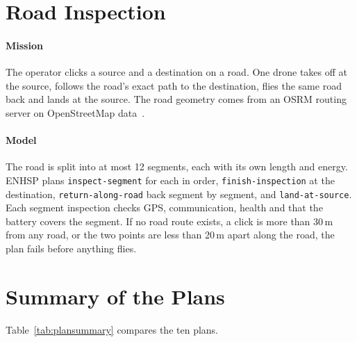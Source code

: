 \documentclass[11pt,a4paper,oneside]{report}
\newcommand{\code}[1]{\texttt{#1}}
\begin{document}
\section{Road Inspection}
\paragraph{Mission}
The operator clicks a source and a destination on a road. One drone takes off at the source,
follows the road's exact path to the destination, flies the same road back and lands at the
source. The road geometry comes from an OSRM routing server on OpenStreetMap
data~\cite{luxen2011osrm}.

\paragraph{Model}
The road is split into at most 12 segments, each with its own length and energy. ENHSP plans
\code{inspect-segment} for each in order, \code{finish-inspection} at the destination,
\code{return-along-road} back segment by segment, and \code{land-at-source}. Each segment
inspection checks GPS, communication, health and that the battery covers the segment. If no road
route exists, a click is more than 30\,m from any road, or the two points are less than 20\,m
apart along the road, the plan fails before anything flies.

\section{Summary of the Plans}
Table~\ref{tab:plansummary} compares the ten plans.
\end{document}
